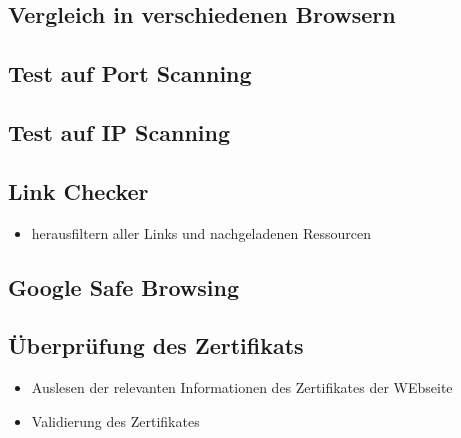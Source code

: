 \subsection{Vergleich in verschiedenen Browsern}

\subsection{Test auf Port Scanning}

\subsection{Test auf IP Scanning}

\subsection{Link Checker}
\begin{itemize}
  \item herausfiltern aller Links und nachgeladenen Ressourcen
\end{itemize}

\subsection{Google Safe Browsing}

\subsection{Überprüfung des Zertifikats}
\begin{itemize}
  \item Auslesen der relevanten Informationen des Zertifikates der WEbseite
  \item Validierung des Zertifikates
\end{itemize}


